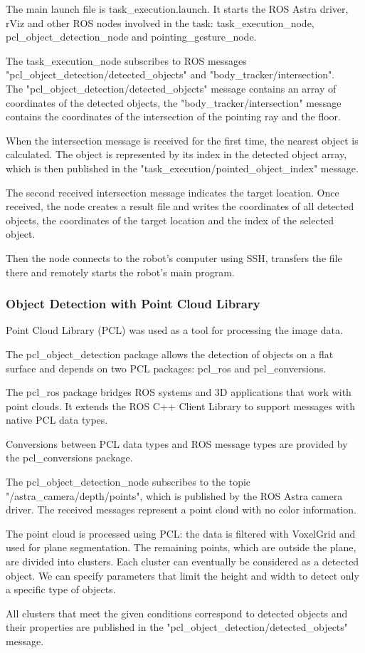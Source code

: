 The main launch file is task\_execution.launch. It starts the ROS Astra driver, rViz and other ROS nodes involved in the task: task\_execution\_node, pcl\_object\_detection\_node and pointing\_gesture\_node.\par
The task\_execution\_node subscribes to ROS messages\\
"pcl\_object\_detection/detected\_objects" and "body\_tracker/intersection".\\
The "pcl\_object\_detection/detected\_objects" message contains an array of coordinates of the detected objects, the "body\_tracker/intersection" message contains the coordinates of the intersection of the pointing ray and the floor.\par
When the intersection message is received for the first time, the nearest object is calculated. The object is represented by its index in the detected object array, which is then published in the "task\_execution/pointed\_object\_index" message.\par
The second received intersection message indicates the target location.
Once received, the node creates a result file and writes the coordinates of all detected objects, the coordinates of the target location and the index of the selected object.\par
Then the node connects to the robot's computer using SSH, transfers the file there and remotely starts the robot's main program.\par

\subsubsection{Object Detection with Point Cloud Library}
Point Cloud Library (PCL) was used as a tool for processing the image data.\par
The pcl\_object\_detection package allows the detection of objects on a flat surface and depends on two PCL packages: pcl\_ros and pcl\_conversions.\par
The pcl\_ros package bridges ROS systems and 3D applications that work with point clouds. It extends the ROS C++ Client Library to support messages with native PCL data types.\par
Conversions between PCL data types and ROS message types are provided by the pcl\_conversions package.\par
The pcl\_object\_detection\_node subscribes to the topic \\"/astra\_camera/depth/points", which is published by the ROS Astra camera driver. The received messages represent a point cloud with no color information.\par
The point cloud is processed using PCL: the data is filtered with VoxelGrid and used for plane segmentation. The remaining points, which are outside the plane, are divided into clusters.
Each cluster can eventually be considered as a detected object. We can specify parameters that limit the height and width to detect only a specific type of objects.\par
All clusters that meet the given conditions correspond to detected objects and their properties are published in the "pcl\_object\_detection/detected\_objects" message.\par

